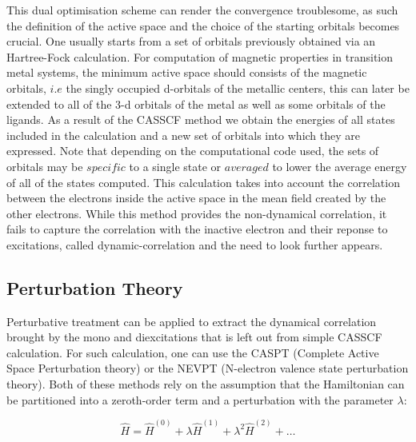 \documentclass[12pt]{report}
\numberwithin{equation}{section}
\begin{document}
This dual optimisation scheme can render the convergence troublesome, as such the definition of the active space and the choice of the starting orbitals becomes crucial. One usually starts from a set of orbitals previously obtained via an Hartree-Fock calculation.
For computation of magnetic properties in transition metal systems, the minimum active space should consists of the magnetic orbitals, $i.e$ the singly occupied d-orbitals of the metallic centers, this can later be extended to all of the 3-d orbitals of the metal as well as some orbitals of the ligands.
As a result of the CASSCF method we obtain the energies of all states included in the calculation and a new set of orbitals into which they are expressed.
Note that depending on the computational code used, the sets of orbitals may be $specific$ to a single state or $averaged$ to lower the average energy of all of the states computed.
This calculation takes into account the correlation between the electrons inside the active space in the mean field created by the other electrons. 
While this method provides the non-dynamical correlation, it fails to capture the correlation with the inactive electron and their reponse to excitations, called dynamic-correlation and the need to look further appears.


\subsection{Perturbation Theory}

Perturbative treatment can be applied to extract the dynamical correlation brought by the mono and diexcitations that is left out from simple CASSCF calculation. For such calculation, one can use the CASPT (Complete Active Space Perturbation theory)
or the NEVPT (N-electron valence state perturbation theory). Both of these methods rely on the assumption that the Hamiltonian can be partitioned into a zeroth-order term and a perturbation with the parameter $\lambda$:

\begin{equation}
    \hat{H}=\hat{H}^{(0)}+\lambda\hat{H}^{(1)}+\lambda^2 \hat{H}^{(2)}+\ldots
\end{equation}
\end{document}

